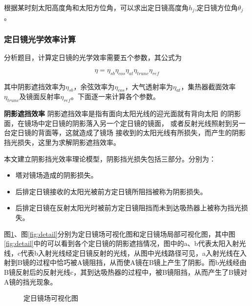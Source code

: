 \documentclass[withoutpreface,bwprint]{cumcmthesis} %
\begin{document}
根据某时刻太阳高度角和太阳方位角，可以求出定日镜高度角$h_{j}$,定日镜方位角$\theta_{j}$。

\subsubsection{定日镜光学效率计算}

分析题目，计算定日镜的光学效率需要五个参数，其公式为

\begin{equation}
    \eta=\eta_{sb}\eta_{cos}\eta_{at}\eta_{trunc}\eta_{ref}
\end{equation}

其中阴影遮挡效率为$\eta_{sb}$，余弦效率为$\eta_{cos}$，大气透射率为$\eta_{at}$，集热器截面效率$\eta_{trunc}$及镜面反射率$\eta_{ref}$。下面逐一来计算各个参数。

\textbf{阴影遮挡效率} \space 阴影遮挡效率是指有面向太阳光线的迎光面就有背向太阳 的阴影面，在镜场中定日镜的阴影落入另一个定日镜的镜面， 或者反射光线照射到另一台定日镜的背面等，这就造成了镜场 接收到的太阳光线有所损失，而产生的阴影挡光损失，这里为求解阴影遮挡效率。

本文建立阴影挡光效率理论模型，阴影挡光损失包括三部分。\cite{魏秀东2009}\cite{张平2021}分别为：

\begin{itemize}
    \item {
          塔对镜场造成的阴影损失。
          }
    \item {
          后排定日镜接收的太阳光被前方定日镜所阻挡被称为阴影损失。
          }
    \item
          {后排定日镜在反射太阳光时被前方定日镜阻挡而未到达吸热器上被称为挡光损失。
          }

\end{itemize}

图\ref{fig:mirror_field}、图\ref{fig:detail}分别为定日镜场可视化图和定日镜场局部可视化图，其中图\ref{fig:detail}中的可以看到各个定日镜的阴影遮挡情况，图中的a、b代表太阳入射光线，c代表b入射光线经定日镜反射的光线，从图中光线路径可见，a入射光线在入射到B镜的过程中恰巧被A镜阻挡，从而使A镜在B镜上产生了阴影。而b光线经由B镜反射后的反射光线c，其到达吸热器的过程中，被B镜阻挡，从而产生了B镜对A镜的挡光现象。

\begin{figure}[hptb]
    \centering
    \caption{定日镜场可视化图}
    \label{fig:mirror_field}
\end{figure}
\end{document}
